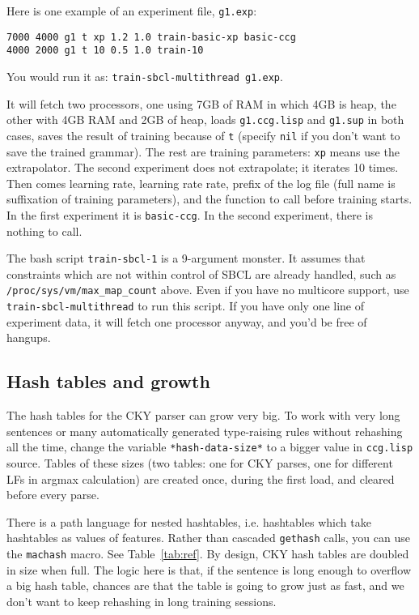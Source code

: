 \documentclass[11pt]{article}
\begin{document}
{{Here is one example of an experiment file, \verb+g1.exp+:
\begin{verbatim}
7000 4000 g1 t xp 1.2 1.0 train-basic-xp basic-ccg
4000 2000 g1 t 10 0.5 1.0 train-10
\end{verbatim}

You would run it as: \verb+train-sbcl-multithread g1.exp+.

It will fetch two processors, one using 7GB of RAM 	in which 4GB is heap, the other with 4GB RAM and 2GB of heap, loads \verb+g1.ccg.lisp+ and \verb+g1.sup+ in both cases, saves the result of training
because of \verb+t+ (specify \verb+nil+ if you don't want to save the trained grammar). The rest are training parameters: \verb+xp+ means
use the extrapolator. The second experiment does not extrapolate; it iterates 10 times. Then comes learning rate, learning rate rate, prefix of the log file (full name is suffixation of training parameters), and the function to call before training starts. In the first experiment it is \verb+basic-ccg+. In the second experiment,
there is nothing to call.

{The bash script} \verb|train-sbcl-1| {is a 9-argument monster}.
It assumes that constraints which are not within control of SBCL are already handled,
such as \verb|/proc/sys/vm/max_map_count| {above}. {Even if you have no multicore support, use} \verb|train-sbcl-multithread|
{to run this script. If you have only one line of experiment data, it will fetch one processor anyway, and you'd be free of hangups.}




\subsection{Hash tables and growth}
{The hash tables for the CKY parser can grow very big. To work with very long sentences  or {many automatically generated type-raising rules}
without rehashing all the time, change the variable \texttt{*hash-data-size*} to a bigger value in \texttt{ccg.lisp} source.
Tables of these sizes (two tables: one for CKY parses, one for different LFs in argmax calculation) are created once, during the first load, and cleared before every parse. 

{There is a path language for nested hashtables, i.e. hashtables which take hashtables as values of features. Rather than cascaded} \verb|gethash| {calls, you can use
the} \verb|machash| {macro. See Table~\ref{tab:ref}.} {By design, CKY hash tables are doubled in size when full.
The logic here is that, if the sentence is long enough to overflow a big hash table, chances are that the table is going to grow just as fast, and we don't
want to keep rehashing in long training sessions.}

}}}
\end{document}
